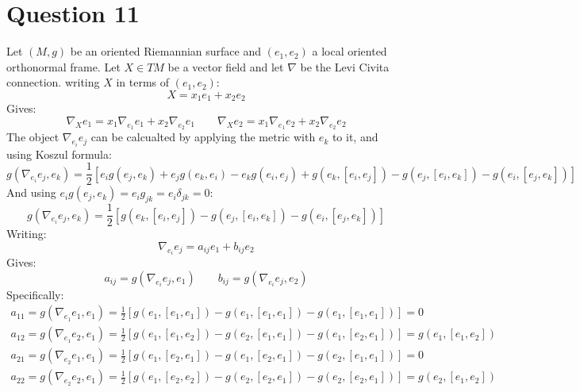 \documentclass{article}
\begin{document}
\section*{Question 11}
Let $(M, g)$ be an oriented Riemannian surface and $(e_1, e_2)$ a local oriented orthonormal frame. Let $X \in TM$ be a vector field and let $\nabla$ be the Levi Civita connection. writing $X$ in terms of $(e_1, e_2)$:
\begin{equation}
    X = x_1 e_1 + x_2 e_2
\end{equation}
Gives:
\begin{equation}
    \nabla_X e_1 = x_1 \nabla_{e_1} e_1 + x_2 \nabla_{e_2} e_1
    \qquad
    \nabla_X e_2 = x_1 \nabla_{e_1} e_2 + x_2 \nabla_{e_2} e_2
\end{equation}
The object $\nabla_{e_i} e_j$ can be calcualted by applying the metric with $e_k$ to it, and using Koszul formula:
\begin{equation}
    g(\nabla_{e_i} e_j, e_k) = \frac{1}{2}\left[
        e_i g(e_j,e_k) + e_j g(e_k,e_i) - e_k g(e_i,e_j) + g(e_k, [e_i, e_j]) - g(e_j, [e_i, e_k]) - g(e_i, [e_j, e_k])
    \right]
\end{equation}
And using $e_i g(e_j, e_k) = e_i g_{jk} = e_i \delta_{jk} = 0$:
\begin{equation}
    g(\nabla_{e_i} e_j, e_k) = \frac{1}{2}\left[g(e_k, [e_i, e_j]) - g(e_j, [e_i, e_k]) - g(e_i, [e_j, e_k])
    \right]
\end{equation}
Writing:
\begin{equation}
    \nabla_{e_i} e_j = a_{ij} e_1 + b_{ij} e_2
\end{equation}
Gives:
\begin{equation}
    a_{ij} = g(\nabla_{e_i} e_j, e_1)
    \qquad
    b_{ij} = g(\nabla_{e_i} e_j, e_2)
\end{equation}
Specifically:
\begin{equation}
\begin{gathered}
    a_{11} = g(\nabla_{e_1} e_1, e_1) = \frac{1}{2}\left[g(e_1, [e_1, e_1]) - g(e_1, [e_1, e_1]) - g(e_1, [e_1, e_1])
    \right] = 0
    \\
    a_{12} = g(\nabla_{e_1} e_2, e_1) = \frac{1}{2}\left[g(e_1, [e_1, e_2]) - g(e_2, [e_1, e_1]) - g(e_1, [e_2, e_1])
    \right] = g(e_1, [e_1, e_2])
    \\
    a_{21} = g(\nabla_{e_2} e_1, e_1) = \frac{1}{2}\left[g(e_1, [e_2, e_1]) - g(e_1, [e_2, e_1]) - g(e_2, [e_1, e_1])
    \right] = 0
    \\
    a_{22} = g(\nabla_{e_2} e_2, e_1) = \frac{1}{2}\left[g(e_1, [e_2, e_2]) - g(e_2, [e_2, e_1]) - g(e_2, [e_2, e_1])
    \right] = g(e_2, [e_1, e_2])
\end{gathered}
\end{equation}
\end{document}
